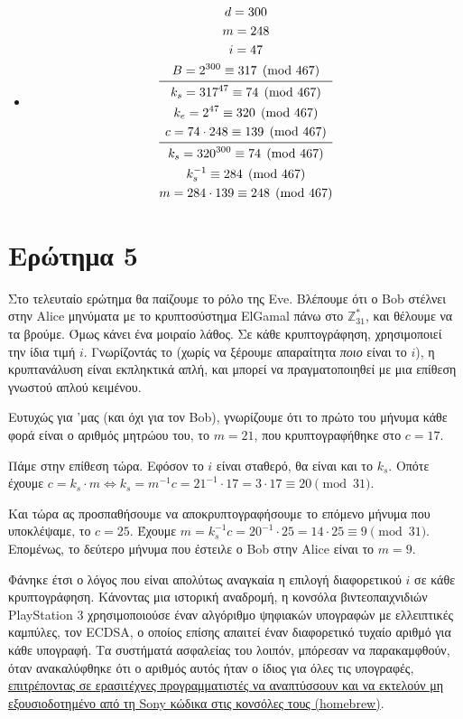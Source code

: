 \documentclass{article}
\begin{document}
\begin{itemize}
    \item
    \begin{gather*}
        d = 300 \\
        m = 248 \\
        i = 47 \\
        B = 2^{300} \equiv 317 \pmod{467} \\
        \midrule
        k_s = 317^{47} \equiv 74 \pmod{467} \\
        k_e = 2^{47} \equiv 320 \pmod{467} \\
        c = 74 \cdot 248 \equiv 139 \pmod{467} \\
        \midrule
        k_s = 320^{300} \equiv 74 \pmod{467} \\
        k_s^{-1} \equiv 284 \pmod{467} \\
        m = 284 \cdot 139 \equiv 248 \pmod{467}
    \end{gather*}
\end{itemize}

\section*{Ερώτημα 5}

Στο τελευταίο ερώτημα θα παίζουμε το ρόλο της Eve. Βλέπουμε ότι ο Bob στέλνει στην Alice μηνύματα με το κρυπτοσύστημα ElGamal πάνω στο $\mathbb{Z}_{31}^*$, και θέλουμε να τα βρούμε. Όμως κάνει ένα μοιραίο λάθος. Σε κάθε κρυπτογράφηση, χρησιμοποιεί την ίδια τιμή $i$. Γνωρίζοντάς το (χωρίς να ξέρουμε απαραίτητα \emph{ποιο} είναι το $i$), η κρυπτανάλυση είναι εκπληκτικά απλή, και μπορεί να πραγματοποιηθεί με μια επίθεση γνωστού απλού κειμένου.

Ευτυχώς για 'μας (και όχι για τον Bob), γνωρίζουμε ότι το πρώτο του μήνυμα κάθε φορά είναι ο αριθμός μητρώου του, το $m = 21$, που κρυπτογραφήθηκε στο $c = 17$.

Πάμε στην επίθεση τώρα. Εφόσον το $i$ είναι σταθερό, θα είναι και το $k_s$. Οπότε έχουμε $c = k_s \cdot m \Leftrightarrow k_s = m^{-1}c = 21^{-1} \cdot 17 = 3 \cdot 17 \equiv 20 \pmod{31}$.

Και τώρα ας προσπαθήσουμε να αποκρυπτογραφήσουμε το επόμενο μήνυμα που υποκλέψαμε, το $c = 25$. Έχουμε $m = k_s^{-1}c = 20^{-1} \cdot 25 = 14 \cdot 25 \equiv 9 \pmod{31}$. Επομένως, το δεύτερο μήνυμα που έστειλε ο Bob στην Alice είναι το $m = 9$.

Φάνηκε έτσι ο λόγος που είναι απολύτως αναγκαία η επιλογή διαφορετικού $i$ σε κάθε κρυπτογράφηση. Κάνοντας μια ιστορική αναδρομή, η κονσόλα βιντεοπαιχνιδιών PlayStation 3 χρησιμοποιούσε έναν αλγόριθμο ψηφιακών υπογραφών με ελλειπτικές καμπύλες, τον ECDSA, ο οποίος επίσης απαιτεί έναν διαφορετικό τυχαίο αριθμό για κάθε υπογραφή. Τα συστήματά ασφαλείας του λοιπόν, μπόρεσαν να παρακαμφθούν, όταν ανακαλύφθηκε ότι ο αριθμός αυτός ήταν ο ίδιος για όλες τις υπογραφές, \href{https://www.exophase.com/20540/hackers-describe-ps3-security-as-epic-fail-gain-unrestricted-access/}{επιτρέποντας σε ερασιτέχνες προγραμματιστές να αναπτύσσουν και να εκτελούν μη εξουσιοδοτημένο από τη Sony κώδικα στις κονσόλες τους (homebrew)}.
\end{document}
